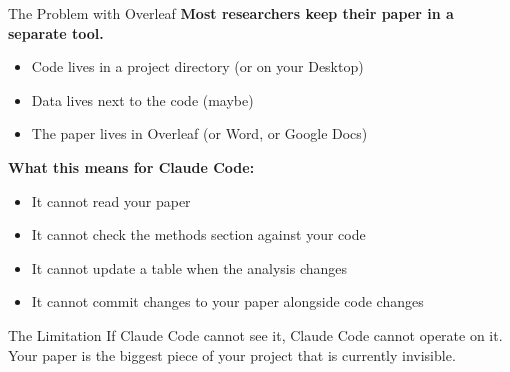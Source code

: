 \documentclass[aspectratio=169, 11pt]{beamer}
\begin{document}
\begin{frame}{The Problem with Overleaf}
  \textbf{Most researchers keep their paper in a separate tool.}

  \vspace{0.5em}
  \begin{itemize}
    \item Code lives in a project directory (or on your Desktop)
    \item Data lives next to the code (maybe)
    \item The paper lives in Overleaf (or Word, or Google Docs)
  \end{itemize}

  \vspace{0.8em}
  \textbf{What this means for Claude Code:}
  \begin{itemize}
    \item It cannot read your paper
    \item It cannot check the methods section against your code
    \item It cannot update a table when the analysis changes
    \item It cannot commit changes to your paper alongside code changes
  \end{itemize}

  \vspace{0.8em}
  \begin{alertblock}{The Limitation}
    If Claude Code cannot see it, Claude Code cannot operate on it.\\
    Your paper is the biggest piece of your project that is currently invisible.
  \end{alertblock}
\end{frame}
\end{document}
